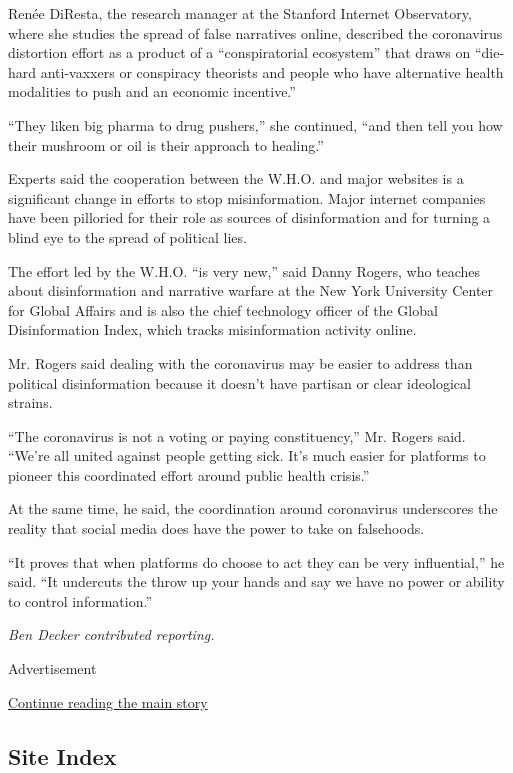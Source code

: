 Renée DiResta, the research manager at the Stanford Internet
Observatory, where she studies the spread of false narratives online,
described the coronavirus distortion effort as a product of a
``conspiratorial ecosystem'' that draws on ``die-hard anti-vaxxers or
conspiracy theorists and people who have alternative health modalities
to push and an economic incentive.''

``They liken big pharma to drug pushers,'' she continued, ``and then
tell you how their mushroom or oil is their approach to healing.''

Experts said the cooperation between the W.H.O. and major websites is a
significant change in efforts to stop misinformation. Major internet
companies have been pilloried for their role as sources of
disinformation and for turning a blind eye to the spread of political
lies.

The effort led by the W.H.O. ``is very new,'' said Danny Rogers, who
teaches about disinformation and narrative warfare at the New York
University Center for Global Affairs and is also the chief technology
officer of the Global Disinformation Index, which tracks misinformation
activity online.

Mr. Rogers said dealing with the coronavirus may be easier to address
than political disinformation because it doesn't have partisan or clear
ideological strains.

``The coronavirus is not a voting or paying constituency,'' Mr. Rogers
said. ``We're all united against people getting sick. It's much easier
for platforms to pioneer this coordinated effort around public health
crisis.''

At the same time, he said, the coordination around coronavirus
underscores the reality that social media does have the power to take on
falsehoods.

``It proves that when platforms do choose to act they can be very
influential,'' he said. ``It undercuts the throw up your hands and say
we have no power or ability to control information.''

\emph{Ben Decker contributed reporting.}

Advertisement

\protect\hyperlink{after-bottom}{Continue reading the main story}

\hypertarget{site-index}{%
\subsection{Site Index}\label{site-index}}

